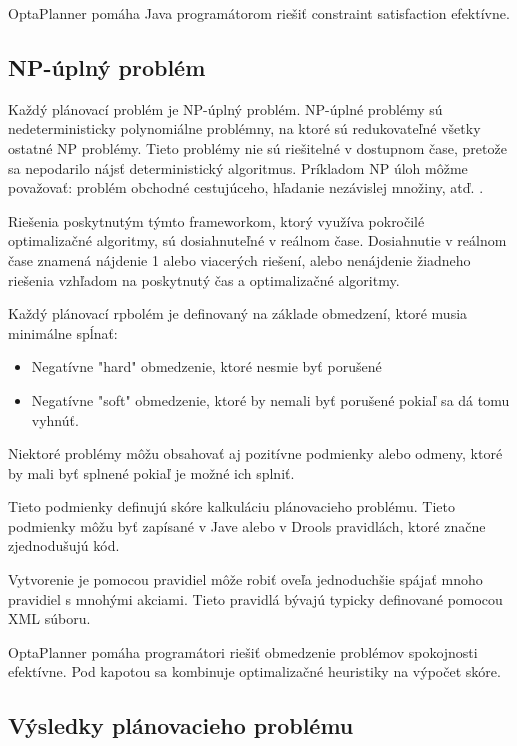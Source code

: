 OptaPlanner pomáha Java programátorom riešiť  constraint satisfaction efektívne.

\subsection{NP-úplný problém}
Každý plánovací problém je NP-úplný problém.\cite{npbook} NP-úplné problémy sú nedeterministicky polynomiálne problémny, na ktoré sú redukovateľné všetky ostatné NP problémy. Tieto problémy nie sú riešitelné v dostupnom čase, pretože sa nepodarilo nájsť deterministický algoritmus. Príkladom NP úloh môžme považovať: problém obchodné cestujúceho, hľadanie nezávislej množiny, atď. . 

Riešenia poskytnutým týmto frameworkom, ktorý využíva pokročilé optimalizačné algoritmy, sú dosiahnuteľné v reálnom čase. Dosiahnutie v reálnom čase znamená nájdenie 1 alebo viacerých riešení, alebo nenájdenie žiadneho riešenia vzhľadom na poskytnutý čas a optimalizačné algoritmy.

Každý plánovací rpbolém je definovaný na základe obmedzení, ktoré musia minimálne spĺnať: \cite{optabook}
\begin{itemize}
\item Negatívne "hard" obmedzenie, ktoré nesmie byť porušené
\item Negatívne "soft" obmedzenie, ktoré by nemali byť porušené pokiaľ sa dá tomu vyhnúť.
\end{itemize}

Niektoré problémy môžu obsahovať aj pozitívne podmienky alebo odmeny, ktoré by mali byť splnené pokiaľ je možné ich splniť.

Tieto podmienky definujú skóre kalkuláciu plánovacieho problému. Tieto podmienky môžu byť zapísané v Jave alebo v Drools pravidlách, ktoré značne zjednodušujú kód.




 Vytvorenie je pomocou pravidiel  môže robiť  oveľa jednoduchšie spájať mnoho pravidiel s mnohými akciami. Tieto pravidlá bývajú typicky definované pomocou XML súboru.

OptaPlanner pomáha  programátori riešiť obmedzenie problémov spokojnosti efektívne. Pod kapotou sa kombinuje optimalizačné heuristiky na výpočet skóre.






\subsection{Výsledky plánovacieho problému}

